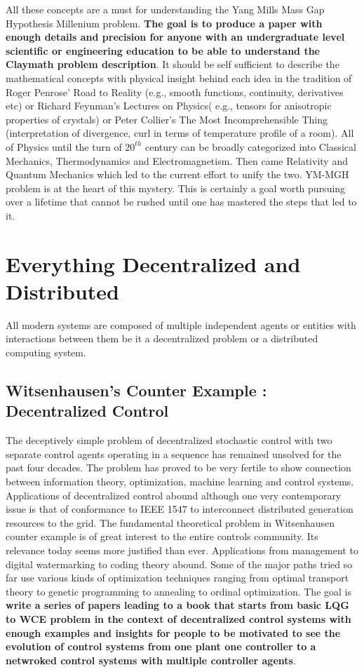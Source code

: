 \documentclass[11pt]{amsart}
\begin{document}
All these concepts are a must for understanding the Yang Mills Mass Gap Hypothesis Millenium problem. 
\textbf{The goal is to produce a paper with enough details and precision for anyone with an undergraduate level scientific or engineering education to be able to understand the Claymath problem description}.  It should be self sufficient to describe the mathematical concepts with physical insight behind each idea in the tradition of Roger Penrose' Road to Reality (e.g., smooth functions, continuity, derivatives etc) or Richard Feynman's Lectures on Physics( e.g., tensors for anisotropic properties of crystals) or Peter Collier's The Most Incomprehensible Thing (interpretation of divergence, curl in terms of temperature profile of a room). 
All of Physics until the turn of $20^{th}$ century can be broadly categorized into Classical Mechanics, Thermodynamics and Electromagnetism. Then came Relativity and Quantum Mechanics which led to the current effort to unify the two. YM-MGH problem is at the heart of this mystery. This is certainly a goal worth pursuing over a lifetime that cannot be rushed until one has mastered the steps that led to it.

\section{Everything Decentralized and Distributed}
All modern systems are composed of multiple independent agents or entities with interactions between them be it a decentralized problem or a distributed computing system.
\subsection{Witsenhausen's Counter Example : Decentralized Control}
The deceptively simple problem of decentralized stochastic control with two separate control agents operating in a sequence has remained unsolved for the past four decades. The problem has proved to be very fertile to show connection between information theory, optimization, machine learning and control systems. Applications of decentralized control abound although one very contemporary issue is that of conformance to IEEE 1547 to interconnect distributed generation resources to the grid. 
The fundamental theoretical problem in Witsenhausen counter example is of great interest to the entire controls community. Its relevance today seems more justified than ever. Applications from management to digital watermarking to coding theory abound. Some of the major paths tried so far use various kinds of optimization techniques ranging from optimal transport theory to genetic programming to annealing to ordinal optimization. The goal is \textbf{write a series of papers leading to a book that starts from basic LQG to WCE problem in the context of decentralized control systems with enough examples and insights for people to be motivated to see the evolution of control systems from one plant one controller to a netwroked control systems with multiple controller agents}.
\end{document}
